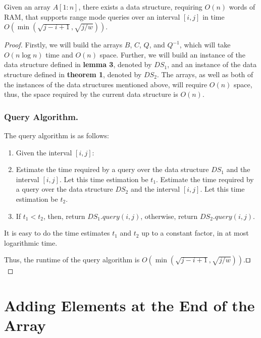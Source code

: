 \documentclass[runningheads]{llncs}
\begin{document}
\begin{theorem}
    Given an array $A[1:n]$, there exists a data structure, requiring $O(n)$ words of RAM, that supports 
    range mode queries over an interval $[i,j]$ in time $O(\min ( \sqrt{j-i+1}, \sqrt{j/w} ) )$.    
\end{theorem}
\begin{proof}
    Firstly, we will build the arrays $B$, $C$, $Q$, and $Q^{-1}$, which will take $O(n\log n)$ time and $O(n)$ space.
    Further, we will build an instance of the data structure defined in \textbf{lemma 3}, denoted by $DS_1$, and an instance of the data structure defined in \textbf{theorem 1}, denoted by $DS_2$.
    The arrays, as well as both of the instances of the data structures mentioned above, will require $O(n)$ space, thus, the space required by the current data structure is $O(n)$.
    
    \subsubsection{Query Algorithm.} The query algorithm is as follows:
    \begin{enumerate}
        \item[] Given the interval $[i,j]$:
        
        \item Estimate the time required by a query over the data structure $DS_1$ and the interval $[i,j]$. Let this time estimation be $t_1$. 
              Estimate the time required by a query over the data structure $DS_2$ and the interval $[i,j]$. Let this time estimation be $t_2$. 
        
        \item If $t_1<t_2$, then, return $DS_1.query(i,j)$, otherwise, return $DS_2.query(i,j)$.      
    
    \end{enumerate}

    It is easy to do the time estimates $t_1$ and $t_2$ up to a constant factor, in at most logarithmic time.
    
    Thus, the runtime of the query algorithm is $O(\min ( \sqrt{j-i+1}, \sqrt{j/w} ) )$.$\qed$

\end{proof}


\section{Adding Elements at the End of the Array}
\end{document}

